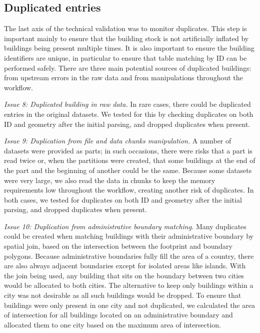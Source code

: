 \documentclass[fleqn,10pt]{wlscirep}
\begin{document}
\subsection*{Duplicated entries}
The last axis of the technical validation was to monitor duplicates. This step is important mainly to ensure that the building stock is not artificially inflated by buildings being present multiple times. It is also important to ensure the building identifiers are unique, in particular to ensure that table matching by ID can be performed safely. There are three main potential sources of duplicated buildings: from upstream errors in the raw data and from manipulations throughout the workflow. 

\medskip \noindent \textit{Issue 8: Duplicated building in raw data.} \hspace{0.1cm}
In rare cases, there could be duplicated entries in the original datasets. We tested for this by checking duplicates on both ID and geometry after the initial parsing, and dropped duplicates when present. 
 
\medskip \noindent \textit{Issue 9: Duplication from file and data chunks manipulation.} \hspace{0.1cm}
A number of datasets were provided as parts; in such occasions, there were risks that a part is read twice or, when the partitions were created, that some buildings at the end of the part and the beginning of another could be the same. Because some datasets were very large, we also read the data in chunks to keep the memory requirements low throughout the workflow, creating another risk of duplicates. In both cases, we tested for duplicates on both ID and geometry after the initial parsing, and dropped duplicates when present.

\medskip \noindent \textit{Issue 10: Duplication from administrative boundary matching.} \hspace{0.1cm} Many duplicates could be created when matching buildings with their administrative boundary by spatial join, based on the intersection between the footprint and boundary polygons. Because administrative boundaries fully fill the area of a country, there are also always adjacent boundaries except for isolated areas like islands. With the join being used, any building that sits on the boundary between two cities would be allocated to both cities. The alternative to keep only buildings within a city was not desirable as all such buildings would be dropped. To ensure that buildings were only present in one city and not duplicated, we calculated the area of intersection for all buildings located on an administrative boundary and allocated them to one city based on the maximum area of intersection. 
\end{document}
